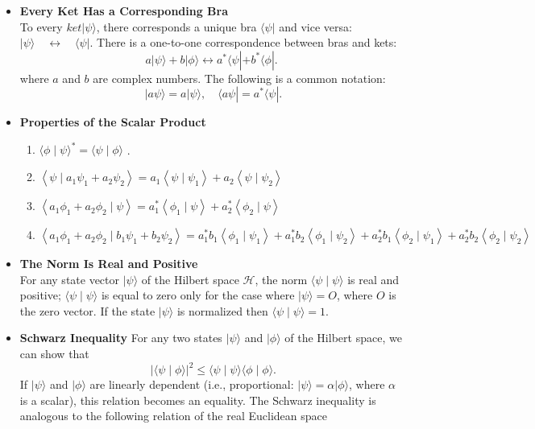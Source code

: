 \begin{itemize}
	\item \textbf{ Every Ket Has a Corresponding Bra}\\
	To every $k e t|\psi\rangle$, there corresponds a unique bra $\langle\psi|$ and vice versa:
	$|\psi\rangle \quad \longleftrightarrow \quad\langle\psi|$.
	There is a one-to-one correspondence between bras and kets:
	$$
	a|\psi\rangle+b|\phi\rangle \longleftrightarrow a^{*}\langle\psi|+b^{*}\langle\phi| \text {. }
	$$
	where $a$ and $b$ are complex numbers. The following is a common notation:
	$$
	|a \psi\rangle=a|\psi\rangle, \quad\langle a \psi|=a^{*}\langle\psi| .
	$$
	\item \textbf{Properties of the Scalar Product}
	\begin{enumerate}
		\item $\langle\phi \mid \psi\rangle^{*}=\langle\psi \mid \phi\rangle $ .
		\item $\left\langle\psi \mid a_{1} \psi_{1}+a_{2} \psi_{2}\right\rangle= a_{1}\left\langle\psi \mid \psi_{1}\right\rangle+a_{2}\left\langle\psi \mid \psi_{2}\right\rangle $
		\item $\left\langle a_{1} \phi_{1}+a_{2} \phi_{2} \mid \psi\right\rangle= a_{1}^{*}\left\langle\phi_{1} \mid \psi\right\rangle+a_{2}^{*}\left\langle\phi_{2} \mid \psi\right\rangle $
		\item $\left\langle a_{1} \phi_{1}+a_{2} \phi_{2} \mid b_{1} \psi_{1}+b_{2} \psi_{2}\right\rangle= a_{1}^{*} b_{1}\left\langle\phi_{1} \mid \psi_{1}\right\rangle+a_{1}^{*} b_{2}\left\langle\phi_{1} \mid \psi_{2}\right\rangle 
		+a_{2}^{*} b_{1}\left\langle\phi_{2} \mid \psi_{1}\right\rangle+a_{2}^{*} b_{2}\left\langle\phi_{2} \mid \psi_{2}\right\rangle$ 
	\end{enumerate}
\item \textbf{ The Norm Is Real and Positive}\\
For any state vector $|\psi\rangle$ of the Hilbert space $\mathcal{H}$, the norm $\langle\psi \mid \psi\rangle$ is real and positive; $\langle\psi \mid \psi\rangle$ is equal to zero only for the case where $|\psi\rangle=O$, where $O$ is the zero vector. If the state $|\psi\rangle$ is normalized then $\langle\psi \mid \psi\rangle=1$.
\item \textbf{Schwarz Inequality}
For any two states $|\psi\rangle$ and $|\phi\rangle$ of the Hilbert space, we can show that
$$
|\langle\psi \mid \phi\rangle|^{2} \leq\langle\psi \mid \psi\rangle\langle\phi \mid \phi\rangle .
$$
If $|\psi\rangle$ and $|\phi\rangle$ are linearly dependent (i.e., proportional: $|\psi\rangle=\alpha|\phi\rangle$, where $\alpha$ is a scalar), this relation becomes an equality. The Schwarz inequality  is analogous to the following relation of the real Euclidean space

\end{itemize}
